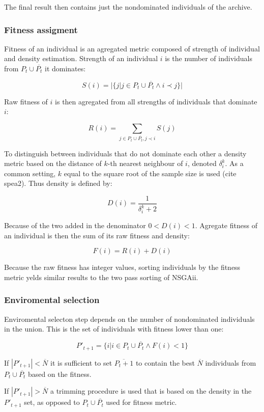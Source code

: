 \documentclass[12pt,oneside,draft]{fithesis2}
\begin{document}
The final result then contains just the nondominated individuals of the archive.

\subsubsection{Fitness assigment}
	Fitness of an individual is an agregated metric composed of strength of individual and density estimation. Strength of an individual $i$ is the number of individuals from $P_t \cup \overline{P_t}$ it dominates:

$$ S(i) = |\{j| j \in P_t \cup \overline{P_t} \land i \prec j\}| $$

Raw fitness of $i$ is then agregated from all strengths of individuals that dominate $i$:

$$ R(i) = \sum\limits_{j \in P_t \cup \overline{P_t},j \prec i} S(j)$$

To distinguish between individuals that do not dominate each other a density metric based on the distance of $k$-th nearest neighbour of $i$, denoted $\delta^k_i$. As a common setting, $k$ equal to the square root of the sample size is used (cite spea2). Thus density is defined by:

$$D(i) = \frac{1}{\delta^k_i + 2} $$

Because of the two added in the denominator  $0 < D(i) < 1$. Agregate fitness of an individual is then the sum of its raw fitness and density:

$$F(i) = R(i) + D(i) $$

Because the raw fitness has integer values, sorting individuals by the fitness metric yelds similar results to the two pass sorting of NSGAii.

\subsubsection{Enviromental selection}
Enviromental selecton step depends on the number of nondominated individuals in the union. This is the set of individuals with fitness lower than one:

$$P'_{t+1} =\{i | i \in P_t \cup \overline{P_t} \land F(i)<1\}$$

If $|P'_{t+1}| < \overline N$ it is sufficient to set $\overline{P_t+1}$ to contain the best $\overline N$ individuals from $P_t \cup \overline{P_t}$ based on the fitness.

If $|P'_{t+1}| > \overline N$ a trimming procedure is used that is based on the density in the $P'_{t+1}$ set, as opposed to $P_t \cup \overline{P_t}$ used for fitness metric.
\end{document}
